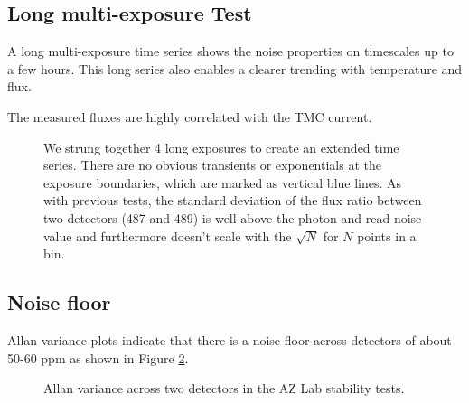\documentclass{aastex62}
\begin{document}
\subsection{Long multi-exposure Test}
A long multi-exposure time series shows the noise properties on timescales up to a few hours.
This long series also enables a clearer trending with temperature and flux.

The measured fluxes are highly correlated with the TMC current.

\begin{figure}
{}
\caption{We strung together 4 long exposures to create an extended time series.
There are no obvious transients or exponentials at the exposure boundaries, which are marked as vertical blue lines.
As with previous tests, the standard deviation of the flux ratio between two detectors (487 and 489) is well above the photon and read noise value and furthermore doesn't scale with the $\sqrt{N}$ for $N$ points in a bin.
}\label{fig:AZlab06LongMultiExp}
\end{figure}




\clearpage
\subsection{Noise floor}

Allan variance plots indicate that there is a noise floor across detectors of about 50-60 ppm as shown in Figure \ref{fig:allanVarianceAZ04AZ05}.

\begin{figure}
{}
\caption{Allan variance across two detectors in the AZ Lab stability tests.}\label{fig:allanVarianceAZ04AZ05}
\end{figure}


\acknowledgments
\end{document}
